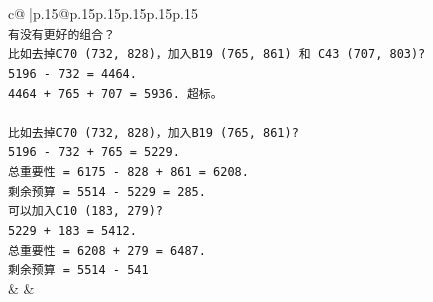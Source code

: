 \documentclass{article}
\begin{document}
{\begin{supertabular}{c@{$\;$}|p{.15\linewidth}@{}p{.15\linewidth}p{.15\linewidth}p{.15\linewidth}p{.15\linewidth}p{.15\linewidth}}
{{{\\ 
\texttt{有没有更好的组合？} \\
\texttt{比如去掉C70 (732, 828)，加入B19 (765, 861) 和 C43 (707, 803)?} \\
\texttt{5196 {-} 732 = 4464.} \\
\texttt{4464 + 765 + 707 = 5936. 超标。} \\
\\ 
\texttt{比如去掉C70 (732, 828)，加入B19 (765, 861)?} \\
\texttt{5196 {-} 732 + 765 = 5229.} \\
\texttt{总重要性 = 6175 {-} 828 + 861 = 6208.} \\
\texttt{剩余预算 = 5514 {-} 5229 = 285.} \\
\texttt{可以加入C10 (183, 279)?} \\
\texttt{5229 + 183 = 5412.} \\
\texttt{总重要性 = 6208 + 279 = 6487.} \\
\texttt{剩余预算 = 5514 {-} 541} \\
            }
        }
    }
    & & \\ \\


\end{supertabular}}
\end{document}
